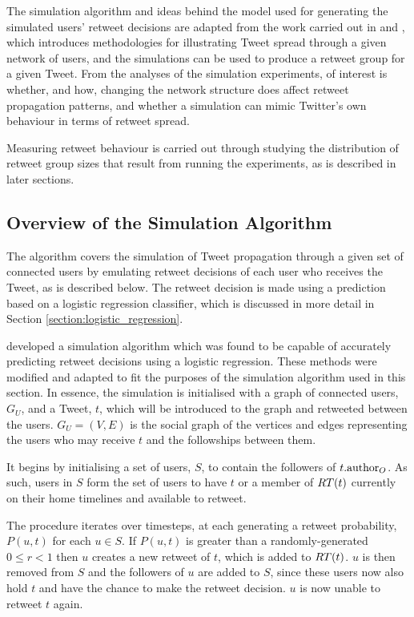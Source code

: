 The simulation algorithm and ideas behind the model used for generating the simulated users' retweet decisions are adapted from the work carried out in \cite{zhu11} and \cite{peng11}, which introduces methodologies for illustrating Tweet spread through a given network of users, and the simulations can be used to produce a retweet group for a given Tweet. From the analyses of the simulation experiments, of interest is whether, and how, changing the network structure does affect retweet propagation patterns, and whether a simulation can mimic Twitter's own behaviour in terms of retweet spread.

Measuring retweet behaviour is carried out through studying the distribution of retweet group sizes that result from running the experiments, as is described in later sections.

\subsection{Overview of the Simulation Algorithm}
The algorithm covers the simulation of Tweet propagation through a given set of connected users by emulating retweet decisions of each user who receives the Tweet, as is described below. The retweet decision is made using a prediction based on a logistic regression classifier, which is discussed in more detail in Section \ref{section:logistic_regression}.

\cite{zhu11} developed a simulation algorithm which was found to be capable of accurately predicting retweet decisions using a logistic regression. These methods were modified and adapted to fit the purposes of the simulation algorithm used in this section. In essence, the simulation is initialised with a graph of connected users, $G_U$, and a Tweet, $t$, which will be introduced to the graph and retweeted between the users. $G_U = (V,E)$ is the social graph of the vertices and edges representing the users who may receive $t$ and the followships between them.

It begins by initialising a set of users, $S$, to contain the followers of $t.\textrm{author}_O$. As such, users in $S$ form the set of users to have $t$ or a member of $RT(t)$ currently on their home timelines and available to retweet. 

The procedure iterates over timesteps, at each generating a retweet probability, $P(u,t)$ for each $u \in S$. If $P(u,t)$ is greater than a randomly-generated $0 \leq r < 1$ then $u$ creates a new retweet of $t$, which is added to $RT(t)$. $u$ is then removed from $S$ and the followers of $u$ are added to $S$, since these users now also hold $t$ and have the chance to make the retweet decision. $u$ is now unable to retweet $t$ again.

